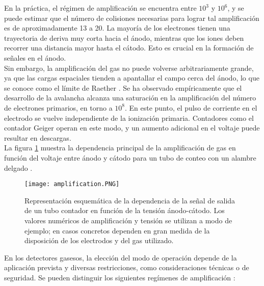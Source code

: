 \documentclass{report}
\begin{document}
\noindent En la práctica, el régimen de amplificación se encuentra entre \(10^3\) y \(10^6\), y se puede estimar que el número de colisiones necesarias para lograr tal amplificación es de aproximadamente 13 a 20. La mayoría de los electrones tienen una trayectoria de deriva muy corta hacia el ánodo, mientras que los iones deben recorrer una distancia mayor hasta el cátodo. Esto es crucial en la formación de señales en el ánodo.\\

\noindent Sin embargo, la amplificación del gas no puede volverse arbitrariamente grande, ya que las cargas espaciales tienden a apantallar el campo cerca del ánodo, lo que se conoce como el límite de Raether \cite{raether1964electron}. Se ha observado empíricamente que el desarrollo de la avalancha alcanza una saturación en la amplificación del número de electrones primarios, en torno a \(10^8\). En este punto, el pulso de corriente en el electrodo se vuelve independiente de la ionización primaria. Contadores como el contador Geiger operan en este modo, y un aumento adicional en el voltaje puede resultar en descargas.\\

\noindent La figura \ref{fig:amplification} muestra la dependencia principal de la amplificación de gas en función del voltaje entre ánodo y cátodo para un tubo de conteo con un alambre delgado \cite{montgomery1941geiger}. 

\begin{figure}[H]
    \centering
    \texttt{[image: amplification.PNG]}
    \caption{Representación esquemática de la dependencia de la
    señal de salida de un tubo contador en función de la tensión ánodo-cátodo. Los valores numéricos de amplificación y tensión se utilizan a modo de ejemplo; en casos concretos dependen en gran medida de la disposición de los electrodos y del gas utilizado. }
    \label{fig:amplification}
\end{figure}

\noindent En los detectores gasesos, la elección del modo de operación depende de la aplicación prevista y diversas restricciones, como consideraciones técnicas o de seguridad. Se pueden distinguir los siguientes regímenes de amplificación \cite{kolanoski2020particle3}: 
\end{document}
